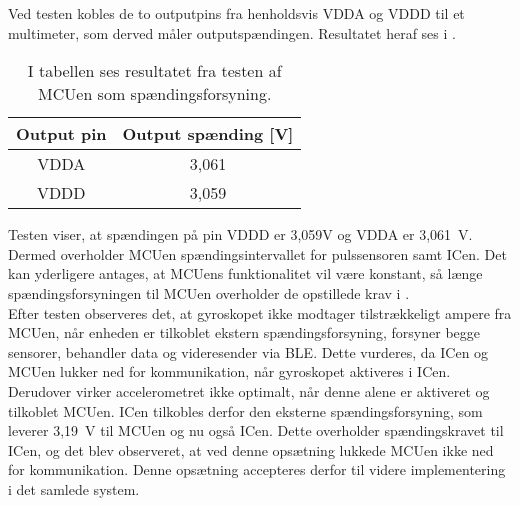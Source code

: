 Ved testen kobles de to outputpins fra henholdsvis VDDA og VDDD til et multimeter, som derved måler outputspændingen. Resultatet heraf ses i .
\begin{table}[H]
	\centering
	\begin{tabular}{cc}
		\hline
		\cellcolor[HTML]{C0C0C0} Output pin & \cellcolor[HTML]{C0C0C0} Output spænding {[}V{]} \\ \hline
		VDDA & 3,061 \\ \hline
		VDDD & 3,059  \\ \hline
	\end{tabular}
	\caption{I tabellen ses resultatet fra testen af MCUen som spændingsforsyning.}
	\label{tab:IC_spaending}
\end{table}\vspace{-0.2cm}
Testen viser, at spændingen på pin VDDD er 3,059V og VDDA er 3,061~V. Dermed overholder MCUen spændingsintervallet for pulssensoren samt ICen. Det kan yderligere antages, at MCUens funktionalitet vil være konstant, så længe spændingsforsyningen til MCUen overholder de opstillede krav i .\\
Efter testen observeres det, at gyroskopet ikke modtager tilstrækkeligt ampere fra MCUen, når enheden er tilkoblet ekstern spændingsforsyning, forsyner begge sensorer, behandler data og videresender via BLE. Dette vurderes, da ICen og MCUen lukker ned for kommunikation, når gyroskopet aktiveres i ICen. Derudover virker accelerometret ikke optimalt, når denne alene er aktiveret og tilkoblet MCUen. ICen tilkobles derfor den eksterne spændingsforsyning, som leverer 3,19~V til MCUen og nu også ICen. Dette overholder spændingskravet til ICen, og det blev observeret, at ved denne opsætning lukkede MCUen ikke ned for kommunikation. Denne opsætning accepteres derfor til videre implementering i det samlede system.